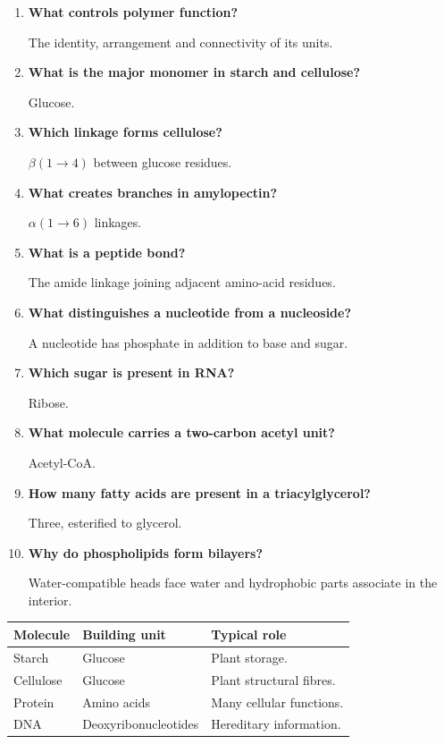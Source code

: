 \documentclass[12pt,a4paper]{article}
\newcommand{\Q}[1]{\textbf{#1}\par\noindent\ignorespaces}
\begin{document}
\begin{tcolorbox}[exambox, title={Frequently Asked / Viva Questions}]
\begin{enumerate}[topsep=0pt, label=\textbf{Q\arabic*.}, itemsep=5pt, leftmargin=*]
  \item \Q{What controls polymer function?}
    The identity, arrangement and connectivity of its units.
  \item \Q{What is the major monomer in starch and cellulose?}
    Glucose.
  \item \Q{Which linkage forms cellulose?}
    $\beta(1\to4)$ between glucose residues.
  \item \Q{What creates branches in amylopectin?}
    $\alpha(1\to6)$ linkages.
  \item \Q{What is a peptide bond?}
    The amide linkage joining adjacent amino-acid residues.
  \item \Q{What distinguishes a nucleotide from a nucleoside?}
    A nucleotide has phosphate in addition to base and sugar.
  \item \Q{Which sugar is present in RNA?}
    Ribose.
  \item \Q{What molecule carries a two-carbon acetyl unit?}
    Acetyl-CoA.
  \item \Q{How many fatty acids are present in a triacylglycerol?}
    Three, esterified to glycerol.
  \item \Q{Why do phospholipids form bilayers?}
    Water-compatible heads face water and hydrophobic parts associate in the interior.
\end{enumerate}
\end{tcolorbox}

\begin{tcolorbox}[tikzbox, title={Summary Comparison}]
\par\vspace{5pt}
\begingroup
\setlength{\extrarowheight}{1pt}
\noindent\begin{tabularx}{\linewidth}{|B{3.45cm}|Y|Y|}
\hline
\textbf{Molecule} & \textbf{Building unit} & \textbf{Typical role} \\ \hline
Starch & Glucose & Plant storage. \\ \hline
Cellulose & Glucose & Plant structural fibres. \\ \hline
Protein & Amino acids & Many cellular functions. \\ \hline
DNA & Deoxyribonucleotides & Hereditary information. \\ \hline
\end{tabularx}\par
\endgroup
\end{tcolorbox}
\end{document}
